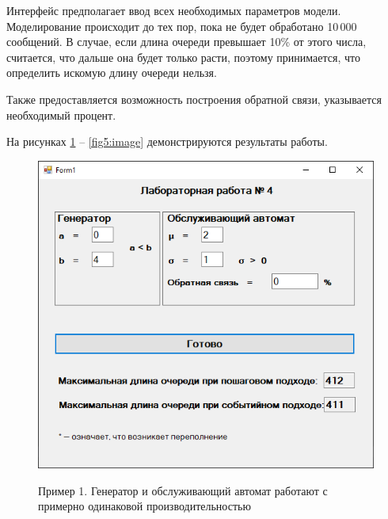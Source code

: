 Интерфейс предполагает ввод всех необходимых параметров модели. Моделирование происходит до тех пор, пока не будет обработано 10\,000 сообщений. В случае, если длина очереди превышает 10\% от этого числа, считается, что дальше она будет только расти, поэтому принимается, что определить искомую длину очереди нельзя.

Также предоставляется возможность построения обратной связи, указывается необходимый процент.

На рисунках \ref{fig1:image} -- \ref{fig5:image} демонстрируются результаты работы.

\begin{figure}[h]
	\begin{center}
		{\includegraphics[scale = 0.7]{img/ex1.png}}
		\caption{Пример 1. Генератор и обслуживающий автомат работают с примерно одинаковой производительностью}
		\label{fig1:image}
	\end{center}
\end{figure}

